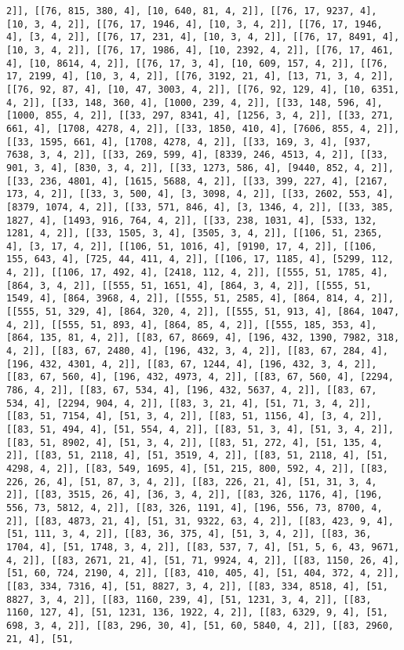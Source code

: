 \documentclass[12pt,fleqn]{article}\usepackage{../../common}
\begin{document}
\begin{verbatim}
2]], [[76, 815, 380, 4], [10, 640, 81, 4, 2]], [[76, 17, 9237, 4], [10, 3, 4, 2]], [[76, 17, 1946, 4], [10, 3, 4, 2]], [[76, 17, 1946, 4], [3, 4, 2]], [[76, 17, 231, 4], [10, 3, 4, 2]], [[76, 17, 8491, 4], [10, 3, 4, 2]], [[76, 17, 1986, 4], [10, 2392, 4, 2]], [[76, 17, 461, 4], [10, 8614, 4, 2]], [[76, 17, 3, 4], [10, 609, 157, 4, 2]], [[76, 17, 2199, 4], [10, 3, 4, 2]], [[76, 3192, 21, 4], [13, 71, 3, 4, 2]], [[76, 92, 87, 4], [10, 47, 3003, 4, 2]], [[76, 92, 129, 4], [10, 6351, 4, 2]], [[33, 148, 360, 4], [1000, 239, 4, 2]], [[33, 148, 596, 4], [1000, 855, 4, 2]], [[33, 297, 8341, 4], [1256, 3, 4, 2]], [[33, 271, 661, 4], [1708, 4278, 4, 2]], [[33, 1850, 410, 4], [7606, 855, 4, 2]], [[33, 1595, 661, 4], [1708, 4278, 4, 2]], [[33, 169, 3, 4], [937, 7638, 3, 4, 2]], [[33, 269, 599, 4], [8339, 246, 4513, 4, 2]], [[33, 901, 3, 4], [830, 3, 4, 2]], [[33, 1273, 586, 4], [9440, 852, 4, 2]], [[33, 236, 4801, 4], [1615, 5688, 4, 2]], [[33, 399, 227, 4], [2167, 173, 4, 2]], [[33, 3, 500, 4], [3, 3098, 4, 2]], [[33, 2602, 553, 4], [8379, 1074, 4, 2]], [[33, 571, 846, 4], [3, 1346, 4, 2]], [[33, 385, 1827, 4], [1493, 916, 764, 4, 2]], [[33, 238, 1031, 4], [533, 132, 1281, 4, 2]], [[33, 1505, 3, 4], [3505, 3, 4, 2]], [[106, 51, 2365, 4], [3, 17, 4, 2]], [[106, 51, 1016, 4], [9190, 17, 4, 2]], [[106, 155, 643, 4], [725, 44, 411, 4, 2]], [[106, 17, 1185, 4], [5299, 112, 4, 2]], [[106, 17, 492, 4], [2418, 112, 4, 2]], [[555, 51, 1785, 4], [864, 3, 4, 2]], [[555, 51, 1651, 4], [864, 3, 4, 2]], [[555, 51, 1549, 4], [864, 3968, 4, 2]], [[555, 51, 2585, 4], [864, 814, 4, 2]], [[555, 51, 329, 4], [864, 320, 4, 2]], [[555, 51, 913, 4], [864, 1047, 4, 2]], [[555, 51, 893, 4], [864, 85, 4, 2]], [[555, 185, 353, 4], [864, 135, 81, 4, 2]], [[83, 67, 8669, 4], [196, 432, 1390, 7982, 318, 4, 2]], [[83, 67, 2480, 4], [196, 432, 3, 4, 2]], [[83, 67, 284, 4], [196, 432, 4301, 4, 2]], [[83, 67, 1244, 4], [196, 432, 3, 4, 2]], [[83, 67, 560, 4], [196, 432, 4973, 4, 2]], [[83, 67, 560, 4], [2294, 786, 4, 2]], [[83, 67, 534, 4], [196, 432, 5637, 4, 2]], [[83, 67, 534, 4], [2294, 904, 4, 2]], [[83, 3, 21, 4], [51, 71, 3, 4, 2]], [[83, 51, 7154, 4], [51, 3, 4, 2]], [[83, 51, 1156, 4], [3, 4, 2]], [[83, 51, 494, 4], [51, 554, 4, 2]], [[83, 51, 3, 4], [51, 3, 4, 2]], [[83, 51, 8902, 4], [51, 3, 4, 2]], [[83, 51, 272, 4], [51, 135, 4, 2]], [[83, 51, 2118, 4], [51, 3519, 4, 2]], [[83, 51, 2118, 4], [51, 4298, 4, 2]], [[83, 549, 1695, 4], [51, 215, 800, 592, 4, 2]], [[83, 226, 26, 4], [51, 87, 3, 4, 2]], [[83, 226, 21, 4], [51, 31, 3, 4, 2]], [[83, 3515, 26, 4], [36, 3, 4, 2]], [[83, 326, 1176, 4], [196, 556, 73, 5812, 4, 2]], [[83, 326, 1191, 4], [196, 556, 73, 8700, 4, 2]], [[83, 4873, 21, 4], [51, 31, 9322, 63, 4, 2]], [[83, 423, 9, 4], [51, 111, 3, 4, 2]], [[83, 36, 375, 4], [51, 3, 4, 2]], [[83, 36, 1704, 4], [51, 1748, 3, 4, 2]], [[83, 537, 7, 4], [51, 5, 6, 43, 9671, 4, 2]], [[83, 2671, 21, 4], [51, 71, 9924, 4, 2]], [[83, 1150, 26, 4], [51, 60, 724, 2190, 4, 2]], [[83, 410, 405, 4], [51, 404, 372, 4, 2]], [[83, 334, 7316, 4], [51, 8827, 3, 4, 2]], [[83, 334, 8518, 4], [51, 8827, 3, 4, 2]], [[83, 1160, 239, 4], [51, 1231, 3, 4, 2]], [[83, 1160, 127, 4], [51, 1231, 136, 1922, 4, 2]], [[83, 6329, 9, 4], [51, 698, 3, 4, 2]], [[83, 296, 30, 4], [51, 60, 5840, 4, 2]], [[83, 2960, 21, 4], [51, 
\end{verbatim}
\end{document}
